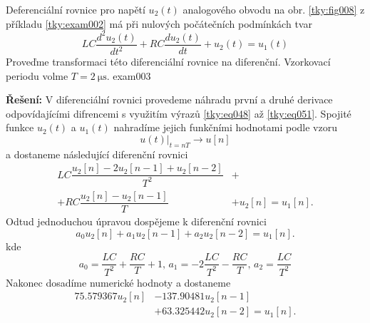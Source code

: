 \begin{tkyexam}{Deferenciální rovnice pro napětí \(u_2(t)\) analogového obvodu na obr.
  \ref{tky:fig008} z příkladu \ref{tky:exam002} má při nulových počátečních podmínkách tvar
  \begin{equation*}
    LC\frac{d^2u_2(t)}{dt^2}+RC\frac{du_2(t)}{dt}+u_2(t)=u_1(t)
  \end{equation*}
  Proveďme transformaci této diferenciální rovnice na diferenční. Vzorkovací periodu volme \(T =
  \SI{2}{\us}\). }{exam003}

  \noindent\textbf{Řešení:}
  V diferenciální rovnici provedeme náhradu první a druhé derivace odpovídajícími difrencemi s
  využitím výrazů \ref{tky:eq048} až \ref{tky:eq051}. Spojité funkce \(u_2(t)\) a \(u_1(t)\)
  nahradíme jejich funkčními hodnotami podle vzoru
  \begin{equation*}
    \left.u(t)\right\rvert_{t=nT}  \rightarrow u[n]
  \end{equation*}
  a dostaneme následující diferenční rovnici
  \begin{align*}
      LC\dfrac{u_2[n] - 2u_2[n-1]    + u_2[n-2]}{T^2} &+      \\
    + RC\dfrac{u_2[n] - u_2[n-1]}{T}                  &+ u_2[n]=u_1[n]. 
  \end{align*}
  Odtud jednoduchou úpravou dospějeme k diferenční rovnici
  \begin{equation*}
    a_0u_2[n] + a_1u_2[n-1] + a_2u_2[n-2]=u_1[n].
  \end{equation*}
  kde
  \begin{equation*}
    a_0 = \frac{LC}{T^2} + \frac{RC}{T} + 1, \, a_1 = -2\frac{LC}{T^2} - \frac{RC}{T}, \,  
    a_2 = \frac{LC}{T^2}
  \end{equation*}
  Nakonec dosadíme numerické hodnoty a dostaneme
  \begin{align}
    \num{75.579367}u_2[n] &- \num{137.90481}u_2[n-1]                       \nonumber \\
                          &+ \num{63.325442}u_2[n-2] = u_1[n].             \label{tky:eq061}
  \end{align}
\end{tkyexam}
